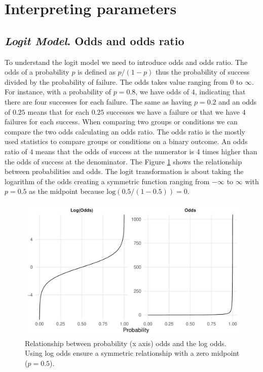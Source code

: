 \documentclass[
  man, mask,floatsintext]{apa6}
\begin{document}
\section{Interpreting parameters}\label{interpreting-parameters}

\subsection{\texorpdfstring{\emph{Logit Model}. Odds and odds ratio}{Logit Model. Odds and odds ratio}}\label{logit-model.-odds-and-odds-ratio}

To understand the logit model we need to introduce odds and odds ratio. The odds of a probability \(p\) is defined as \(p/(1 - p)\) thus the probability of success divided by the probability of failure. The odds takes value ranging from 0 to \(\infty\). For instance, with a probability of \(p = 0.8\), we have odds of \(4\), indicating that there are four successes for each failure. The same as having \(p = 0.2\) and an odds of \(0.25\) means that for each \(0.25\) successes we have a failure or that we have \(4\) failures for each success. When comparing two groups or conditions we can compare the two odds calculating an odds ratio. The odds ratio is the mostly used statistics to compare groups or conditions on a binary outcome. An odds ratio of \(4\) means that the odds of success at the numerator is 4 times higher than the odds of success at the denominator. The Figure \ref{fig:fig-odds-example} shows the relationship between probabilities and odds. The logit transformation is about taking the logarithm of the odds creating a symmetric function ranging from \(-\infty\) to \(\infty\) with \(p = 0.5\) as the midpoint because \(\text{log}(0.5/(1 - 0.5)) = 0\).

\scriptsize

\begin{figure}

{\centering \includegraphics[width=1\linewidth]{paper_files/figure-latex/fig-odds-example-1} 

}

\caption{Relationship between probability (x axis) odds and the log odds. Using log odds ensure a symmetric relationship with a zero midpoint (\(p = 0.5\)).}\label{fig:fig-odds-example}
\end{figure}
\end{document}
